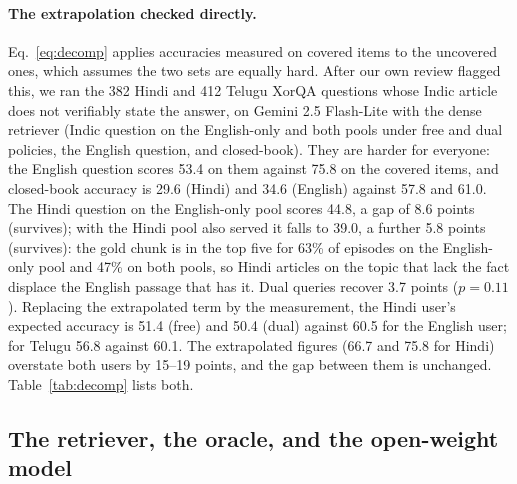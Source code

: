 \paragraph{The extrapolation checked directly.} Eq.~\ref{eq:decomp} applies accuracies measured on covered items to the uncovered ones, which assumes the two sets are equally hard. After our own review flagged this, we ran the 382 Hindi and 412 Telugu XorQA questions whose Indic article does not verifiably state the answer, on Gemini 2.5 Flash-Lite with the dense retriever (Indic question on the English-only and both pools under free and dual policies, the English question, and closed-book). They are harder for everyone: the English question scores 53.4 on them against 75.8 on the covered items, and closed-book accuracy is 29.6 (Hindi) and 34.6 (English) against 57.8 and 61.0. The Hindi question on the English-only pool scores 44.8, a gap of 8.6 points (survives); with the Hindi pool also served it falls to 39.0, a further 5.8 points (survives): the gold chunk is in the top five for 63\% of episodes on the English-only pool and 47\% on both pools, so Hindi articles on the topic that lack the fact displace the English passage that has it. Dual queries recover 3.7 points ($p=0.11$). Replacing the extrapolated term by the measurement, the Hindi user's expected accuracy is 51.4 (free) and 50.4 (dual) against 60.5 for the English user; for Telugu 56.8 against 60.1. The extrapolated figures (66.7 and 75.8 for Hindi) overstate both users by 15--19 points, and the gap between them is unchanged. Table~\ref{tab:decomp} lists both.

\subsection{The retriever, the oracle, and the open-weight model}
\label{sec:results-retriever}

